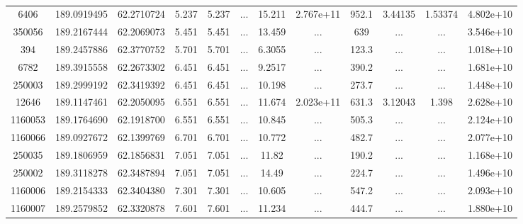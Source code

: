 \begin{table*}
\begin{tabular}{cccccccccccc}
           6406 &     189.0919495 &      62.2710724 &           5.237 &           5.237 &             ... &          15.211 &       2.767e+11 &           952.1 &         3.44135 &         1.53374 &       4.802e+10 \\
         350056 &     189.2167444 &      62.2069073 &           5.451 &           5.451 &             ... &          13.459 &             ... &             639 &             ... &             ... &       3.546e+10 \\
            394 &     189.2457886 &      62.3770752 &           5.701 &           5.701 &             ... &          6.3055 &             ... &           123.3 &             ... &             ... &       1.018e+10 \\
           6782 &     189.3915558 &      62.2673302 &           6.451 &           6.451 &             ... &          9.2517 &             ... &           390.2 &             ... &             ... &       1.681e+10 \\
         250003 &     189.2999192 &      62.3419392 &           6.451 &           6.451 &             ... &          10.198 &             ... &           273.7 &             ... &             ... &       1.448e+10 \\
          12646 &     189.1147461 &      62.2050095 &           6.551 &           6.551 &             ... &          11.674 &       2.023e+11 &           631.3 &         3.12043 &           1.398 &       2.628e+10 \\
        1160053 &     189.1764690 &      62.1918700 &           6.551 &           6.551 &             ... &          10.845 &             ... &           505.3 &             ... &             ... &       2.124e+10 \\
        1160066 &     189.0927672 &      62.1399769 &           6.701 &           6.701 &             ... &          10.772 &             ... &           482.7 &             ... &             ... &       2.077e+10 \\
         250035 &     189.1806959 &      62.1856831 &           7.051 &           7.051 &             ... &           11.82 &             ... &           190.2 &             ... &             ... &       1.168e+10 \\
         250002 &     189.3118278 &      62.3487894 &           7.051 &           7.051 &             ... &           14.49 &             ... &           224.7 &             ... &             ... &       1.496e+10 \\
        1160006 &     189.2154333 &      62.3404380 &           7.301 &           7.301 &             ... &          10.605 &             ... &           547.2 &             ... &             ... &       2.093e+10 \\
        1160007 &     189.2579852 &      62.3320878 &           7.601 &           7.601 &             ... &          11.234 &             ... &           444.7 &             ... &             ... &       1.880e+10 \\
  \hline
  \end{tabular}
  \caption{
  \label{Tab02}}
\end{table*}
